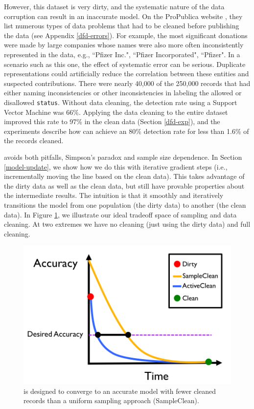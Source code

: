 However, this dataset is very dirty, and the systematic nature of the data corruption can result in an inaccurate model.
On the ProPublica website \cite{dollarsfordocs}, they list numerous types of data problems that had to be cleaned before publishing the data (see Appendix \ref{dfd-errors}).
For example, the most significant donations were made by large companies whose names were also more often inconsistently represented in the data, e.g., ``Pfizer Inc.", ``Pfizer Incorporated", ``Pfizer".
In a scenario such as this one, the effect of systematic error can be serious.
Duplicate representations could artificially reduce the correlation between these entities and suspected contributions.
There were nearly 40,000 of the 250,000 records that had either naming inconsistencies or other inconsistencies in labeling the allowed or disallowed \texttt{status}.
Without data cleaning, the detection rate using a Support Vector Machine was 66\%.
Applying the data cleaning to the entire dataset improved this rate to 97\% in the clean data (Section \ref{dfd-exp}), and the experiments describe how \sys can achieve an 80\% detection rate for less than 1.6\% of the records cleaned.



\iffalse
\sys avoids both pitfalls, Simpson's paradox and sample size dependence.
In Section \ref{model-update}, we show how we do this with iterative gradient steps (i.e., incrementally moving the line based on the clean data).
This takes advantage of the dirty data as well as the clean data, but still have provable properties about the intermediate results.
The intuition is that it smoothly and iteratively transitions the model from one population (the dirty data) to another (the clean data).
In Figure \ref{sys-arch2}, we illustrate our ideal tradeoff space of sampling and data cleaning.
At two extremes we have no cleaning (just using the dirty data) and full cleaning.

\begin{figure}[t]
\centering
 \includegraphics[width=0.5\columnwidth]{figs/arch2.png}
 \caption{\sys is designed to converge to an accurate model with fewer cleaned records than a uniform sampling approach (SampleClean). \label{sys-arch2}}\vspace{-1em}
\end{figure}


